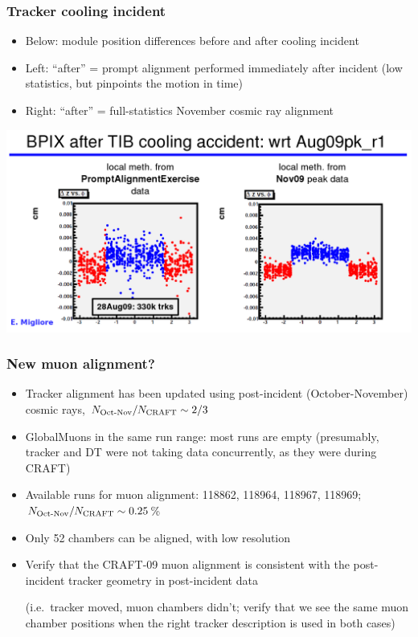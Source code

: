 \documentclass[compress]{beamer}
\begin{document}
\begin{frame}
\frametitle{Tracker cooling incident}

\begin{itemize}
\item Below: module position differences before and after cooling incident

\item Left: ``after'' = prompt alignment performed immediately after
  incident (low statistics, but pinpoints the motion in time)

\item Right: ``after'' = full-statistics November cosmic ray alignment
\end{itemize}

\includegraphics[width=\linewidth]{pxb_motion.png}
\end{frame}

\begin{frame}
\frametitle{New muon alignment?}

\begin{itemize}
\item Tracker alignment has been updated using post-incident
  (October-November) cosmic rays, $N_{\mbox{\scriptsize Oct-Nov}}/N_{\mbox{\scriptsize CRAFT}} \sim 2/3$
\item GlobalMuons in the same run range: most runs are empty
  (presumably, tracker and DT were not taking data concurrently, as
  they were during CRAFT)
\item Available runs for muon alignment: 118862, 118964, 118967,
  118969; $N_{\mbox{\scriptsize Oct-Nov}}/N_{\mbox{\scriptsize CRAFT}} \sim 0.25$\%
\item Only 52 chambers can be aligned, with low resolution
\item Verify that the CRAFT-09 muon alignment is consistent with the
  post-incident tracker geometry in post-incident data

(i.e.\ tracker moved, muon chambers didn't; verify that we see the
  same muon chamber positions when the right tracker description is
  used in both cases)
\end{itemize}
\end{frame}
\end{document}
